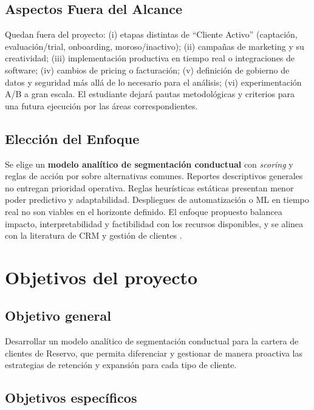 \subsection{Aspectos Fuera del Alcance}

Quedan fuera del proyecto: (i) etapas distintas de “Cliente Activo” (captación, evaluación/trial, onboarding, moroso/inactivo); (ii) campañas de marketing y su creatividad; (iii) implementación productiva en tiempo real o integraciones de software; (iv) cambios de pricing o facturación; (v) definición de gobierno de datos y seguridad más allá de lo necesario para el análisis; (vi) experimentación A/B a gran escala. El estudiante dejará pautas metodológicas y criterios para una futura ejecución por las áreas correspondientes.

\subsection{Elección del Enfoque}

Se elige un \textbf{modelo analítico de segmentación conductual} con \textit{scoring} y reglas de acción por sobre alternativas comunes. Reportes descriptivos generales no entregan prioridad operativa. Reglas heurísticas estáticas presentan menor poder predictivo y adaptabilidad. Despliegues de automatización o ML en tiempo real no son viables en el horizonte definido. El enfoque propuesto balancea impacto, interpretabilidad y factibilidad con los recursos disponibles, y se alinea con la literatura de CRM y gestión de clientes \citep{Kumar2010}.

\section{Objetivos del proyecto}

\subsection{Objetivo general}

Desarrollar un modelo analítico de segmentación conductual para la cartera de clientes de Reservo, que permita diferenciar y gestionar de manera proactiva las estrategias de retención y expansión para cada tipo de cliente.

\subsection{Objetivos específicos}

